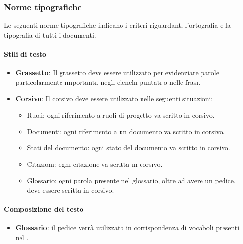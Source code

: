 \subsubsection{Norme tipografiche}
Le seguenti norme tipografiche indicano i criteri riguardanti l'ortografia e la tipografia di tutti i documenti.

\paragraph{Stili di testo}
\begin{itemize}
  \item \textbf{Grassetto}: Il grassetto deve essere utilizzato per evidenziare parole
  particolarmente importanti, negli elenchi puntati o nelle frasi.
  \item \textbf{Corsivo}: Il corsivo deve essere utilizzato nelle seguenti
  situazioni:
  \begin{itemize}
    \item Ruoli: ogni riferimento a ruoli di progetto va scritto in corsivo.
    \item Documenti: ogni riferimento a un documento va scritto in corsivo.
    \item Stati del documento: ogni stato del documento va scritto in corsivo.
    \item Citazioni: ogni citazione va scritta in corsivo.
    \item Glossario: ogni parola presente nel glossario, oltre ad avere un pedice, deve
    essere scritta in corsivo.
  \end{itemize}
\end{itemize}

\paragraph{Composizione del testo}
\begin{itemize}
   \item \textbf{Glossario}: il pedice \termine{} verrà utilizzato in corrispondenza di vocaboli presenti nel \textit{\glossario}.
\end{itemize}

